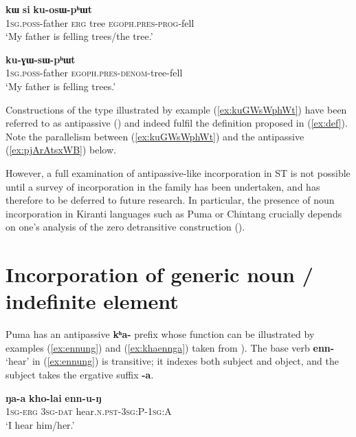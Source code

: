 \documentclass[oneside,a4paper,11pt]{article}
\newcommand{\ipa}[1]{{\phon\textbf{#1}}}
\begin{document}
 
\begin{exe}
\ex \label{ex:kosWphWt}
\gll \ipa{a-wa} \ipa{kɯ} \ipa{si} \ipa{ku-osɯ-pʰɯt} \\
\textsc{1sg.poss}-father \textsc{erg} tree \textsc{egoph.pres-prog}-fell \\
\glt `My father is felling trees/the tree.'
\end{exe}	 

\begin{exe}
\ex   \label{ex:kuGWsWphWt}
\gll \ipa{a-wa} \ipa{ku-ɣɯ-sɯ-pʰɯt} \\
\textsc{1sg.poss}-father \textsc{egoph.pres-denom}-tree-fell \\
\glt `My father is felling trees.'
\end{exe}	 

Constructions of the type illustrated by example (\ref{ex:kuGWsWphWt}) have been referred to as antipassive (\citealt[47-48]{say09antipassive}) and indeed fulfil the definition proposed in (\ref{ex:def}). Note the parallelism between (\ref{ex:kuGWsWphWt}) and the antipassive (\ref{ex:pjArAtsxWB}) below.

However, a full examination of antipassive-like incorporation in ST is not possible until a survey of incorporation in the family has been undertaken, and has therefore to be deferred to future research. In particular, the presence of noun incorporation in Kiranti languages such as Puma or Chintang crucially depends on one's analysis of the zero detransitive construction (\citealt{bickel11multivariate}).

 
\section{Incorporation of generic noun / indefinite element} \label{sec:kha}
Puma has an antipassive \ipa{kʰa-} prefix whose function can be illustrated by examples (\ref{ex:ennung}) and (\ref{ex:khaennga}) taken from \citet[7-9]{bickel07puma}). The base verb \ipa{enn-} `hear' in (\ref{ex:ennung}) is transitive; it indexes both subject and object, and the subject takes the ergative suffix \ipa{-a}.

\begin{exe}
\ex \label{ex:ennung}
\gll 
\ipa{ŋa-a} \ipa{kho-lai} \ipa{enn-u-ŋ} \\
\textsc{1sg-erg} \textsc{3sg-dat} hear.\textsc{n.pst}-\textsc{3sg:P-1sg:A} \\
\glt `I hear him/her.'
\end{exe}
\end{document}

